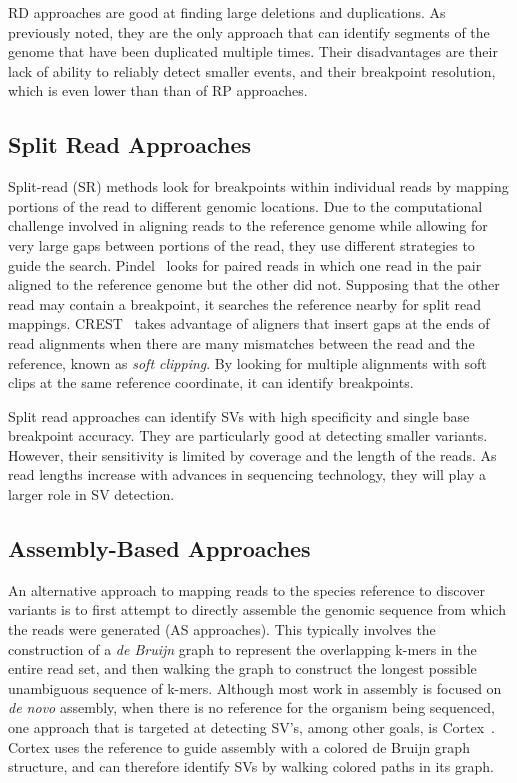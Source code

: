 \documentclass [11pt] {report}
\begin{document}
RD approaches are good at finding large deletions and duplications. As previously noted, they are the only approach that can identify segments of the genome that have been duplicated multiple times. Their disadvantages are their lack of ability to reliably detect smaller events, and their breakpoint resolution, which is even lower than than of RP approaches.

\subsection{Split Read Approaches}

Split-read (SR) methods look for breakpoints within individual reads by mapping portions of the read to different genomic locations. Due to the computational challenge involved in aligning reads to the reference genome while allowing for very large gaps between portions of the read, they use different strategies to guide the search. Pindel~\cite{Ye:2009p2} looks for paired reads in which one read in the pair aligned to the reference genome but the other did not. Supposing that the other read may contain a breakpoint, it searches the reference nearby for split read mappings. CREST~\cite{Wang:2011p1607} takes advantage of aligners that insert gaps at the ends of read alignments when there are many mismatches between the read and the reference, known as \emph{soft clipping}. By looking for multiple alignments with soft clips at the same reference coordinate, it can identify breakpoints. 

Split read approaches can identify SVs with high specificity and single base breakpoint accuracy. They are particularly good at detecting smaller variants. However, their sensitivity is limited by coverage and the length of the reads. As read lengths increase with advances in sequencing technology, they will play a larger role in SV detection.

\subsection{Assembly-Based Approaches}

An alternative approach to mapping reads to the species reference to discover variants is to first attempt to directly assemble the genomic sequence from which the reads were generated (AS approaches). This typically involves the construction of a \emph{de Bruijn} graph to represent the overlapping k-mers in the entire read set, and then walking the graph to construct the longest possible unambiguous sequence of k-mers. Although most work in assembly is focused on \emph{de novo} assembly, when there is no reference for the organism being sequenced, one approach that is targeted at detecting SV's, among other goals, is Cortex~\cite{Iqbal:2012p1837}. Cortex uses the reference to guide assembly with a colored de Bruijn graph structure, and can therefore identify SVs by walking colored paths in its graph.
\end{document}
